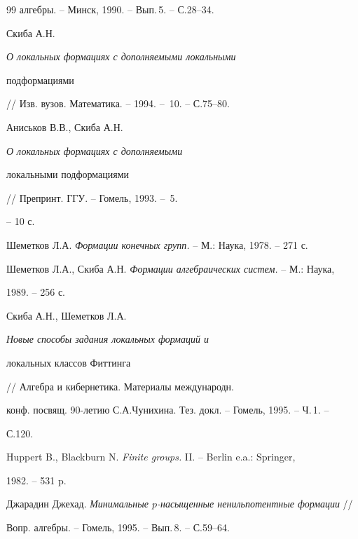 \begin{thebibliography}{99}
алгебры. -- Минск, 1990. -- Вып.\,5. -- С.28--34. 


 




Скиба А.Н. {\em О локальных формациях с дополняемыми локальными 


подформациями} // Изв. вузов. Математика. -- 1994. -- \No\,10. -- С.75--80. 


 




Аниськов В.В., Скиба А.Н. {\em О локальных формациях с дополняемыми 


локальными подформациями} // Препринт. ГГУ. -- Гомель, 1993. -- \No\,5. 


-- 10 с. 


 




Шеметков Л.А. {\em Формации конечных групп.} -- М.: Наука, 1978. -- 271 с. 


 




Шеметков Л.А., Скиба А.Н. {\em Формации алгебраических систем.} -- М.: Наука, 


1989. -- 256 с. 


 




Скиба А.Н., Шеметков Л.А. {\em Новые способы задания локальных формаций и 


локальных классов Фиттинга} // Алгебра и кибернетика. Материалы международн. 


конф. посвящ. 90-летию С.А.Чунихина. Тез. докл. -- Гомель, 1995. -- Ч.\,1. -- 


С.120. 


 




Huppert B., Blackburn N. {\em Finite groups.} II. -- Berlin e.a.: Springer, 


1982. -- 531 p. 


 




Джарадин Джехад. {\em Минимальные $p$-насыщенные ненильпотентные формации} // 


Вопр. алгебры. -- Гомель, 1995. -- Вып.\,8. -- С.59--64. 



\end{thebibliography}

